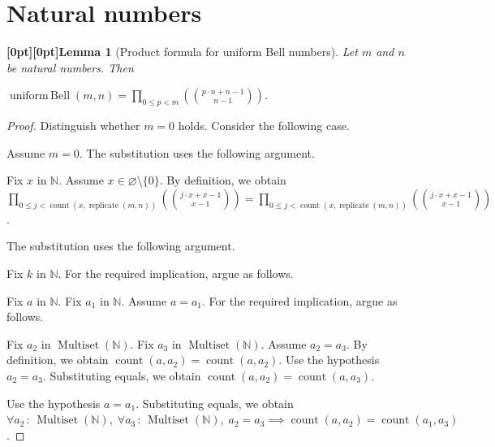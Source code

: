 \documentclass{article}
\makeatletter
\newcommand{\paperanchor}[1]{\hypertarget{#1}{}}%
\def\paperdest{\pdfextension dest}\def\paperstart{\pdfextension startlink}%
\def\paperend{\pdfextension endlink}\def\papercolor{\pdfextension colorstack}%
\let\paperdest\pdfdest\let\paperstart\pdfstartlink\let\paperend\pdfendlink\let\papercolor\pdfcolorstack
\newcommand{\paperanchor}[1]{\paperdest name{#1} xyz}%
\newcommand{\paperanchor}[1]{\special{pdf:dest (#1) [@thispage /XYZ null @ypos null]}}%
\newcommand{\paperlineanchor}[1]{\raisebox{10pt}[0pt][0pt]{\paperanchor{#1}}}
\DeclareRobustCommand{\paperresultname}[1]{\paperlineanchor{theorem:\arabic{theorem}}#1}
\theoremstyle{paperresult}
\newtheorem{lemma}[theorem]{\paperresultname{Lemma}}
\newenvironment{proofstep}{\par\smallskip\ifdim\leftskip<3em\relax\advance\leftskip by 1em\relax\fi\noindent\ignorespaces}{\par\smallskip}
\makeatother
\begin{document}
\section{Natural numbers}
\begin{lemma}[{Product formula for uniform Bell numbers}]\label{theorem:4}
Let \(m\) and \(n\) be natural numbers. Then
\begin{center}
\(\displaystyle \operatorname{uniform\,Bell}(m,\allowbreak{} n) = \prod_{0\le p<m}(\binom{p \cdot n + n - 1}{n - 1}).\)
\end{center}
\end{lemma}

\begin{proof}
Distinguish whether \(m = 0\) holds.
Consider the following case.
\begin{proofstep}
Assume \(m = 0\).
The substitution uses the following argument.
\begin{proofstep}
Fix \(x\) in \(\mathbb{N}\).
Assume \(x \in \varnothing \setminus \{0\}\).
By definition, we obtain \(\prod_{0\le j<\operatorname{count}(x,\allowbreak{} \operatorname{replicate}(m,\allowbreak{} n))}(\binom{j \cdot x + x - 1}{x - 1}) = \prod_{0\le j<\operatorname{count}(x,\allowbreak{} \operatorname{replicate}(m,\allowbreak{} n))}(\binom{j \cdot x + x - 1}{x - 1})\).
\end{proofstep}
The substitution uses the following argument.
\begin{proofstep}
Fix \(k\) in \(\mathbb{N}\).
For the required implication, argue as follows.
\begin{proofstep}
Fix \(a\) in \(\mathbb{N}\).
Fix \(a_{1}\) in \(\mathbb{N}\).
Assume \(a = a_{1}\).
For the required implication, argue as follows.
\begin{proofstep}
Fix \(a_{2}\) in \(\operatorname{Multiset}(\mathbb{N})\).
Fix \(a_{3}\) in \(\operatorname{Multiset}(\mathbb{N})\).
Assume \(a_{2} = a_{3}\).
By definition, we obtain \(\operatorname{count}\left(a, a_{2}\right) = \operatorname{count}\left(a, a_{2}\right)\).
Use the hypothesis \(a_{2} = a_{3}\).
Substituting equals, we obtain \(\operatorname{count}\left(a, a_{2}\right) = \operatorname{count}\left(a, a_{3}\right)\).
\end{proofstep}
Use the hypothesis \(a = a_{1}\).
Substituting equals, we obtain \(\forall a_{2}\, :\, \operatorname{Multiset}(\mathbb{N}),\; \forall a_{3}\, :\, \operatorname{Multiset}(\mathbb{N}),\; a_{2} = a_{3} \implies \operatorname{count}(a,\allowbreak{} a_{2}) = \operatorname{count}(a_{1},\allowbreak{} a_{3})\).

\end{proofstep}
\end{proofstep}
\end{proofstep}
\end{proof}
\end{document}
